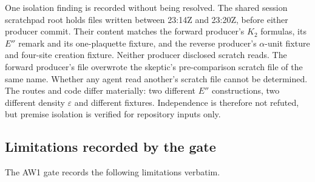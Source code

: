 One isolation finding is recorded without being resolved. The shared session
scratchpad root holds files written between 23:14Z and 23:20Z, before either
producer commit. Their content matches the forward producer's $K_2$ formulas,
its $E''$ remark and its one-plaquette fixture, and the reverse producer's
$\alpha$-unit fixture and four-site creation fixture. Neither producer
disclosed scratch reads. The forward producer's file overwrote the
skeptic's pre-comparison scratch file of the same name. Whether any agent read
another's scratch file cannot be determined. The routes and code differ
materially: two different $E''$ constructions, two different density
$\varepsilon$ and different fixtures. Independence is therefore not refuted,
but premise isolation is verified for repository inputs only.

\subsection{Limitations recorded by the gate}
\label{sec:aw1-limits}
The AW1 gate records the following limitations verbatim.
